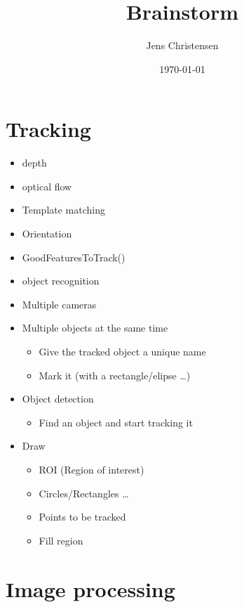 \documentclass[11pt]{article}
\title{Brainstorm}
\author{Jens Christensen}
\date{\today}
\begin{document}
\maketitle

\section*{Tracking}
\begin{itemize}
 
  \item depth
  \item optical flow
  \item Template matching
  \item Orientation
  \item GoodFeaturesToTrack()
  \item object recognition 
  \item Multiple cameras
  \item Multiple objects at the same time
    \begin{itemize}
      \item Give the tracked object a unique name
      \item Mark it (with a rectangle/elipse \ldots)
    \end{itemize}

  \item Object detection
    \begin{itemize}
      \item Find an object and start tracking it
    \end{itemize}

  \item Draw
    \begin{itemize}
        \item ROI (Region of interest)
        \item Circles/Rectangles \ldots
        \item Points to be tracked
        \item Fill region
    \end{itemize}
 
\end{itemize}

\newpage
\section*{Image processing}
\end{document}
